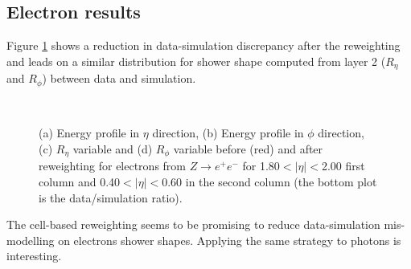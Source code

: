 \subsection{Electron results}
Figure \ref{fig:gamma:ss:reweighting:electron} shows a reduction in data-simulation discrepancy after the reweighting and leads on a similar distribution for shower shape computed from layer 2 ($R_{\eta}$ and $R_{\phi}$) between data and simulation.
\begin{figure}[ht]
    \centering
     \\
    \caption{(a) Energy profile in $\eta$ direction, (b) Energy profile in $\phi$ direction, (c) $R_{\eta}$ variable and (d) $R_{\phi}$ variable before (red) and after reweighting for electrons from $Z\rightarrow e^+e^-$ for 1.80$<|\eta|<$2.00 first column and 0.40$<|\eta|<$0.60 in the second column (the bottom plot is the data/simulation ratio).}
    \label{fig:gamma:ss:reweighting:electron}
\end{figure}
The cell-based reweighting seems to be promising to reduce data-simulation mis-modelling on electrons shower shapes. Applying the same strategy to photons is interesting. 
